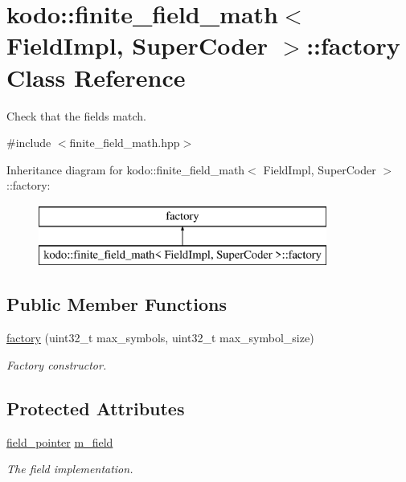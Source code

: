 \hypertarget{classkodo_1_1finite__field__math_1_1factory}{\section{kodo\-:\-:finite\-\_\-field\-\_\-math$<$ Field\-Impl, Super\-Coder $>$\-:\-:factory Class Reference}
\label{classkodo_1_1finite__field__math_1_1factory}
}


Check that the fields match.  




{\ttfamily \#include $<$finite\-\_\-field\-\_\-math.\-hpp$>$}

Inheritance diagram for kodo\-:\-:finite\-\_\-field\-\_\-math$<$ Field\-Impl, Super\-Coder $>$\-:\-:factory\-:\begin{figure}[H]
\begin{center}
\leavevmode
\includegraphics[height=2.000000cm]{classkodo_1_1finite__field__math_1_1factory}
\end{center}
\end{figure}
\subsection*{Public Member Functions}
\begin{DoxyCompactItemize}
\item 
\hyperlink{classkodo_1_1finite__field__math_1_1factory_ac6effc8a01347aac1bf078177352cea1}{factory} (uint32\-\_\-t max\-\_\-symbols, uint32\-\_\-t max\-\_\-symbol\-\_\-size)
\begin{DoxyCompactList}\small\item\em Factory constructor. \end{DoxyCompactList}\end{DoxyCompactItemize}
\subsection*{Protected Attributes}
\begin{DoxyCompactItemize}
\item 
\hypertarget{classkodo_1_1finite__field__math_1_1factory_a3bb57404f0dcbf4bccad43d60773a1f3}{\hyperlink{classkodo_1_1finite__field__math_adc8809e96febdd3ada1a8eb784aa2da2}{field\-\_\-pointer} \hyperlink{classkodo_1_1finite__field__math_1_1factory_a3bb57404f0dcbf4bccad43d60773a1f3}{m\-\_\-field}}\label{classkodo_1_1finite__field__math_1_1factory_a3bb57404f0dcbf4bccad43d60773a1f3}

\begin{DoxyCompactList}\small\item\em The field implementation. \end{DoxyCompactList}\end{DoxyCompactItemize}
